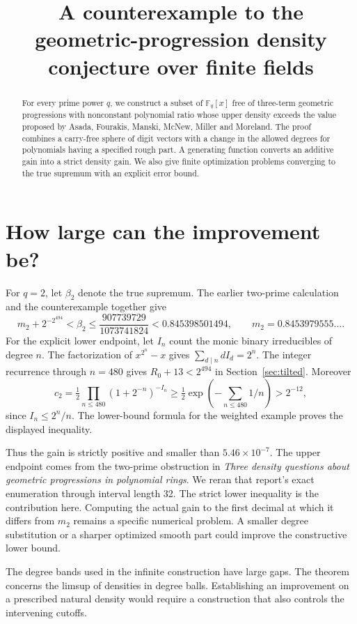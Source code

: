 \documentclass[11pt]{article}
\title{A counterexample to the geometric-progression density conjecture over finite fields}
\begin{document}
\maketitle
\begin{abstract}
For every prime power $q$, we construct a subset of $\mathbb F_q[x]$ free of three-term geometric progressions with nonconstant polynomial ratio whose upper density exceeds the value proposed by Asada, Fourakis, Manski, McNew, Miller and Moreland. The proof combines a carry-free sphere of digit vectors with a change in the allowed degrees for polynomials having a specified rough part. A generating function converts an additive gain into a strict density gain. We also give finite optimization problems converging to the true supremum with an explicit error bound.
\end{abstract}






\section{How large can the improvement be?}
For $q=2$, let $\beta_2$ denote the true supremum. The earlier two-prime calculation and the counterexample together give
\[
  m_2+2^{-2^{494}} < \beta_2 \le \frac{907739729}{1073741824}
       <0.845398501494, \qquad m_2=0.8453979555\ldots .
\]
For the explicit lower endpoint, let $I_n$ count the monic binary irreducibles of degree $n$. The factorization of $x^{2^n}-x$ gives $\sum_{d\mid n}d I_d=2^n$. The integer recurrence through $n=480$ gives $R_0+13<2^{494}$ in Section~\ref{sec:tilted}. Moreover
\[
 c_2=\tfrac12\prod_{n\le480}(1+2^{-n})^{-I_n}
 \ge \tfrac12\exp\left(-\sum_{n\le480}1/n\right)>2^{-12},
\]
since $I_n\le2^n/n$. The lower-bound formula for the weighted example proves the displayed inequality.

Thus the gain is strictly positive and smaller than $5.46\times10^{-7}$. The upper endpoint comes from the two-prime obstruction in \emph{Three density questions about geometric progressions in polynomial rings}. We reran that report's exact enumeration through interval length 32. The strict lower inequality is the contribution here. Computing the actual gain to the first decimal at which it differs from $m_2$ remains a specific numerical problem. A smaller degree substitution or a sharper optimized smooth part could improve the constructive lower bound.

The degree bands used in the infinite construction have large gaps. The theorem concerns the limsup of densities in degree balls. Establishing an improvement on a prescribed natural density would require a construction that also controls the intervening cutoffs.
\end{document}
